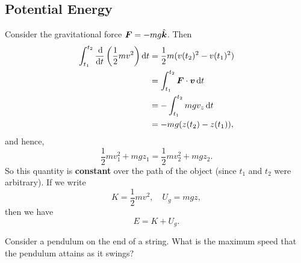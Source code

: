 \documentclass[../classical_mechanics.tex]{subfiles}
\begin{document}
        \subsection{Potential Energy}\label{subsec:potential-energy}
            Consider the gravitational force $\boldsymbol{F}=-mg\hat{\boldsymbol{k}}$. Then
            \begin{align}
                \int_{t_1}^{t_2}\dv{}{t}\left(\frac{1}{2}mv^2\right)\dd{t}&=\frac{1}{2}m(v(t_2)^2-v(t_1)^2)\\
                &=\int_{t_1}^{t_2}\vec{F}\cdot\vec{v}\dd{t}\\
                &=-\int_{t_1}^{t_2}mgv_z\dd{t}\\
                &=-mg(z(t_2)-z(t_1)),
            \end{align}
            and hence,
            \begin{equation}
                \frac{1}{2}mv_1^2+mgz_1=\frac{1}{2}mv_2^2+mgz_2.
            \end{equation}
            So this quantity is \textbf{constant} over the path of the object (since $t_1$ and $t_2$ were arbitrary).
            If we write
            \begin{equation}
                K=\frac{1}{2}mv^2,\quad U_g=mgz,
            \end{equation}
            then we have
            \begin{equation}
                E=K+U_g.
            \end{equation}
            \begin{example}
                Consider a pendulum on the end of a string. What is the maximum speed that the pendulum attains as it swings?
            \end{example}
\end{document}
